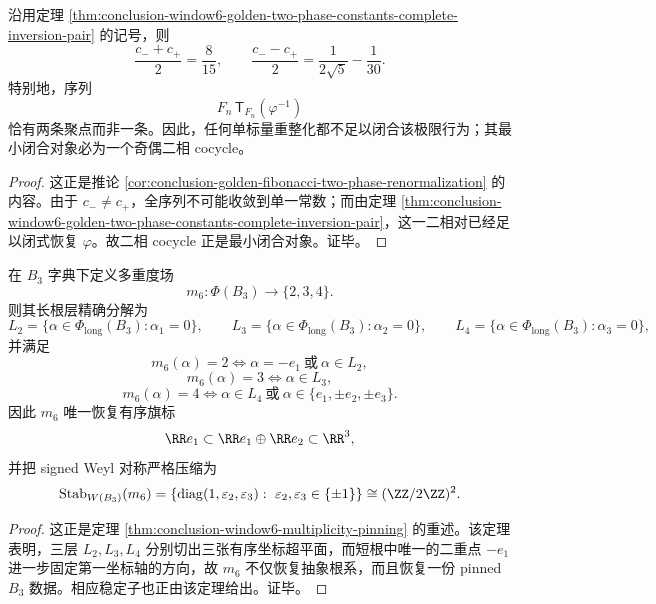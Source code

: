 \begin{corollary}[黄金分支最小重整化对象的二相性]\label{cor:conclusion-window6-golden-two-phase-cocycle-minimality}
沿用定理 \ref{thm:conclusion-window6-golden-two-phase-constants-complete-inversion-pair} 的记号，则
\[
\frac{c_-+c_+}{2}=\frac{8}{15},
\qquad
\frac{c_--c_+}{2}=\frac{1}{2\sqrt5}-\frac1{30}.
\]
特别地，序列
\[
F_n\,\mathsf T_{F_n}(\varphi^{-1})
\]
恰有两条聚点而非一条。因此，任何单标量重整化都不足以闭合该极限行为；其最小闭合对象必为一个奇偶二相 cocycle。
\end{corollary}
\begin{proof}
这正是推论 \ref{cor:conclusion-golden-fibonacci-two-phase-renormalization} 的内容。由于 \(c_-\neq c_+\)，全序列不可能收敛到单一常数；而由定理 \ref{thm:conclusion-window6-golden-two-phase-constants-complete-inversion-pair}，这一二相对已经足以闭式恢复 \(\varphi\)。故二相 cocycle 正是最小闭合对象。证毕。
\end{proof}

\begin{theorem}\label{thm:conclusion-window6-multiplicity-field-pinned-b3-klein-four}
在 \(B_3\) 字典下定义多重度场
\[
m_6:\Phi(B_3)\longrightarrow \{2,3,4\}.
\]
则其长根层精确分解为
\[
L_2=\{\alpha\in\Phi_{\mathrm{long}}(B_3):\alpha_1=0\},
\qquad
L_3=\{\alpha\in\Phi_{\mathrm{long}}(B_3):\alpha_2=0\},
\qquad
L_4=\{\alpha\in\Phi_{\mathrm{long}}(B_3):\alpha_3=0\},
\]
并满足
\[
m_6(\alpha)=2 \iff \alpha=-e_1\ \text{或}\ \alpha\in L_2,
\]
\[
m_6(\alpha)=3 \iff \alpha\in L_3,
\]
\[
m_6(\alpha)=4 \iff \alpha\in L_4\ \text{或}\ \alpha\in \{e_1,\pm e_2,\pm e_3\}.
\]
因此 \(m_6\) 唯一恢复有序旗标
\[
\RR e_1\subset \RR e_1\oplus \RR e_2\subset \RR^3,
\]
并把 signed Weyl 对称严格压缩为
\[
\operatorname{Stab}_{W(B_3)}(m_6)
=
\left\{
\operatorname{diag}(1,\varepsilon_2,\varepsilon_3):\ \varepsilon_2,\varepsilon_3\in\{\pm1\}
\right\}
\cong (\ZZ/2\ZZ)^2.
\]
\end{theorem}
\begin{proof}
这正是定理 \ref{thm:conclusion-window6-multiplicity-pinning} 的重述。该定理表明，三层 \(L_2,L_3,L_4\) 分别切出三张有序坐标超平面，而短根中唯一的二重点 \(-e_1\) 进一步固定第一坐标轴的方向，故 \(m_6\) 不仅恢复抽象根系，而且恢复一份 pinned \(B_3\) 数据。相应稳定子也正由该定理给出。证毕。
\end{proof}

